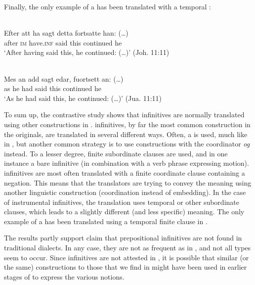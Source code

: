 \documentclass[output=paper]{langscibook}
\begin{document}
Finally, the only example of a  has been translated with a temporal : 


\ea
\label{ex:kalm:30}
\ea {}\label{ex:kalm:30a}\\ 
\gll Efter att ha sagt detta fortsatte han: (…)\\
 after \textsc{im} have.\textsc{inf} said this continued he\\
\glt ‘After having said this, he continued: (…)’ (Joh. 11:11)

\ex {}\label{ex:kalm:30b}\\
\gll Mes an add sagt edar, fuortsett an: (…)\\
 as he had said this continued he\\
\glt ‘As he had said this, he continued: (…)’ (Jua. 11:11)
\z
\z 


To sum up, the contrastive study shows that   infinitives are normally translated using other constructions in .  infinitives, by far the most common construction in the  originals, are translated in several different ways. Often, a  is used, much like in , but another common strategy is to use constructions with the coordinator \textit{og} instead. To a lesser degree, finite subordinate clauses are used, and in one instance a bare infinitive (in combination with a verb phrase expressing motion).  infinitives are most often translated with a finite coordinate clause containing a negation. This means that the translators are trying to convey the  meaning using another linguistic construction (coordination instead of embedding). In the case of instrumental infinitives, the translation uses temporal or other subordinate clauses, which leads to a slightly different (and less specific) meaning. The only example of a  has been translated using a temporal finite clause in . 

The results partly support  claim that prepositional infinitives are not found in traditional dialects. In any case, they are not as frequent as in , and not all types seem to occur. Since  infinitives are not attested in , it is possible that similar (or the same) constructions to those that we find in  might have been used in earlier stages of  to express the various  notions. 
\end{document}
